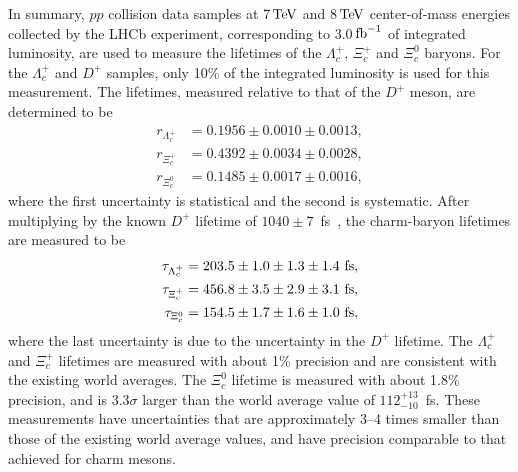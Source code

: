 \documentclass[12pt,a4paper]{article}
\def\PXi         {\ensuremath{\Xi}\xspace}
\def\PLambda     {\ensuremath{\Lambda}\xspace}
\def\PD      {\ensuremath{\mathrm{D}}\xspace}
\def\Pc      {\ensuremath{\mathrm{c}}\xspace}
\def\PD      {\ensuremath{D}\xspace}
\def\Pc      {\ensuremath{c}\xspace}
\def\cquark    {{\ensuremath{\Pc}}\xspace}
\def\D       {{\ensuremath{\PD}}\xspace}
\def\Dp      {{\ensuremath{\D^+}}\xspace}
\def\Lz          {{\ensuremath{\PLambda}}\xspace}
\def\Xires       {{\ensuremath{\PXi}}\xspace}
\def\Lc          {{\ensuremath{\Lz^+_\cquark}}\xspace}
\def\Xicz        {{\ensuremath{\Xires^0_\cquark}}\xspace}
\def\Xicp        {{\ensuremath{\Xires^+_\cquark}}\xspace}
\newcommand{\aunit}[1]{\ensuremath{\text{\,#1}}}
\newcommand{\tev}{\aunit{Te\kern -0.1em V}\xspace}
\def\fb   {\ensuremath{\aunit{fb}}\xspace}
\def\invfb   {\ensuremath{\fb^{-1}}\xspace}
\begin{document}
In summary, $pp$ collision data samples at 7\tev and 8\tev center-of-mass energies collected by the LHCb experiment,
corresponding to 3.0\invfb of integrated luminosity, are used to measure the lifetimes of the $\Lc$, $\Xicp$ and $\Xicz$ baryons. 
For the $\Lc$ and $\Dp$ samples, only 10\% of the integrated luminosity is used for this measurement.
The lifetimes, measured relative to that of the $\Dp$ meson, are determined to be
\begin{align*}
  r_{\Lc} &= 0.1956\pm0.0010\pm0.0013, \\
  r_{\Xicp} &= 0.4392\pm0.0034\pm0.0028, \\
  r_{\Xicz} &= 0.1485\pm0.0017\pm0.0016,
\end{align*}
\noindent where the first uncertainty is statistical and the second is systematic. After multiplying by the
known $\Dp$ lifetime of $1040\pm7$~fs~\cite{PDG2018}, the charm-baryon lifetimes are measured to be
\begin{align*}
  \tau_{\Lc} &= 203.5\pm1.0\pm1.3\pm1.4~{\rm fs}, \\
  \tau_{\Xicp} &= 456.8\pm3.5\pm2.9\pm3.1~{\rm fs}, \\
  \tau_{\Xicz} &= 154.5\pm1.7\pm1.6\pm1.0~{\rm fs},
\end{align*}
\noindent where the last uncertainty is due to the uncertainty in the $\Dp$ lifetime. 
The $\Lc$ and $\Xicp$ lifetimes are measured with about 1\% precision and are consistent with the existing world averages.
The $\Xicz$ lifetime is measured with about 1.8\% precision, and is $3.3\sigma$ larger than the world average value of 
$112^{+13}_{-10}$~fs. These measurements have uncertainties that are approximately 3--4 times smaller than those of the existing 
world average values, and have precision comparable to that achieved for charm mesons.

 
\end{document}
